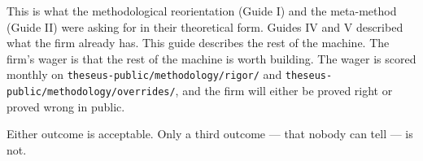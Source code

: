 \documentclass[11pt,letterpaper]{article}
\newcommand{\file}[1]{\texttt{#1}}
\begin{document}
This is what the methodological reorientation (Guide I) and the meta-method (Guide II) were asking for in their theoretical form. Guides IV and V described what the firm already has. This guide describes the rest of the machine. The firm's wager is that the rest of the machine is worth building. The wager is scored monthly on \file{theseus-public/methodology/rigor/} and \file{theseus-public/methodology/overrides/}, and the firm will either be proved right or proved wrong in public.

Either outcome is acceptable. Only a third outcome --- that nobody can tell --- is not.
\end{document}
